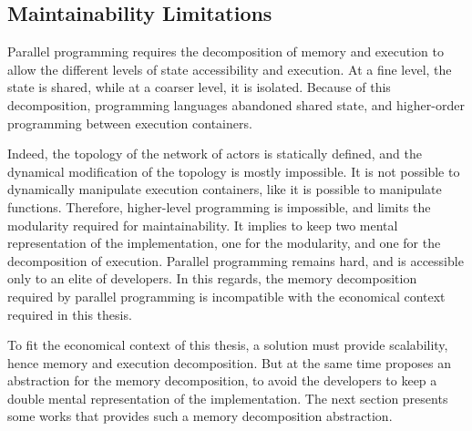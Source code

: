 \subsection{Maintainability Limitations} \label{chapter3:software-performance:maintainability-limitations}

Parallel programming requires the decomposition of memory and execution to allow the different levels of state accessibility and execution.
At a fine level, the state is shared, while at a coarser level, it is isolated.
Because of this decomposition, programming languages abandoned shared state, and higher-order programming between execution containers.

Indeed, the topology of the network of actors is statically defined, and the dynamical modification of the topology is mostly impossible.
It is not possible to dynamically manipulate execution containers, like it is possible to manipulate functions.
Therefore, higher-level programming is impossible, and limits the modularity required for maintainability.
It implies to keep two mental representation of the implementation, one for the modularity, and one for the decomposition of execution.
Parallel programming remains hard, and is accessible only to an elite of developers.
In this regards, the memory decomposition required by parallel programming is incompatible with the economical context required in this thesis.

To fit the economical context of this thesis, a solution must provide scalability, hence memory and execution decomposition.
But at the same time proposes an abstraction for the memory decomposition, to avoid the developers to keep a double mental representation of the implementation.
The next section presents some works that provides such a memory decomposition abstraction.

